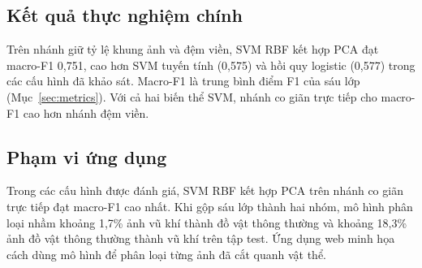 \subsection{Kết quả thực nghiệm chính}

Trên nhánh giữ tỷ lệ khung ảnh và đệm viền, SVM RBF kết hợp PCA đạt macro-F1 0,751, cao hơn SVM tuyến tính (0,575) và hồi quy logistic (0,577) trong các cấu hình đã khảo sát. Macro-F1 là trung bình điểm F1 của sáu lớp (Mục~\ref{sec:metrics}). Với cả hai biến thể SVM, nhánh co giãn trực tiếp cho macro-F1 cao hơn nhánh đệm viền.

\subsection{Phạm vi ứng dụng}

Trong các cấu hình được đánh giá, SVM RBF kết hợp PCA trên nhánh co giãn trực tiếp đạt macro-F1 cao nhất. Khi gộp sáu lớp thành hai nhóm, mô hình phân loại nhầm khoảng 1,7\% ảnh vũ khí thành đồ vật thông thường và khoảng 18,3\% ảnh đồ vật thông thường thành vũ khí trên tập test. Ứng dụng web minh họa cách dùng mô hình để phân loại từng ảnh đã cắt quanh vật thể.

